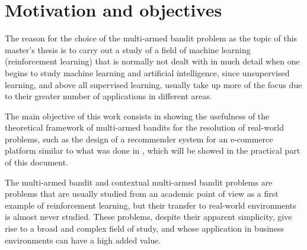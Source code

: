 \documentclass[../main.tex]{subfiles}
\begin{document}
\chapter{Motivation and objectives}\label{ch:motivation}

The reason for the choice of the multi-armed bandit problem as the topic of this
master's thesis is to carry out a study of a field of machine learning (reinforcement
learning) that is normally not dealt with in much detail when one begins to study
machine learning and artificial intelligence, since unsupervised learning, and above
all supervised learning, usually take up more of the focus due to their greater number
of applications in different areas.  

The main objective of this work consists in showing the usefulness of the theoretical
framework of multi-armed bandits for the resolution of real-world problems, such as
the design of a recommender system for an e-commerce platform similar to what was done
in \textcite{rohde2018}, which will be showed in the practical part of this document.  

The multi-armed bandit and contextual multi-armed bandit problems are problems that
are usually studied from an academic point of view as a first example of reinforcement
learning, but their transfer to real-world environments is almost never studied. These
problems, despite their apparent simplicity, give rise to a broad and complex field of
study, and whose application in business environments can have a high added value.  
\end{document}
